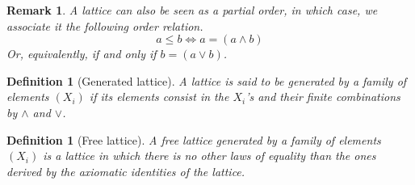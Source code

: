 \documentclass[a4paper, 11pt]{article}
\newtheorem{definition}[theorem]{Definition}
\newtheorem*{remark}{Remark}
\begin{document}
    \begin{remark}
    A lattice can also be seen as a partial order, in which case, we associate it the following order
    relation.
    \[
	a\leq b\Leftrightarrow a=(a\wedge b)
    \]
    Or, equivalently, if and only if $b=(a\vee b)$.	
    \end{remark}
    \begin{definition}[Generated lattice]
	    A lattice is said to be generated by a family of elements $(X_i)$ if its elements consist in
	    the $X_i$'s and their finite combinations by $\wedge$ and $\vee$.
    \end{definition}
    \begin{definition}[Free lattice]
	    A free lattice generated by a family of elements $(X_i)$ is a lattice in which there is no
	    other laws of equality than the ones derived by the axiomatic identities of the lattice.
    \end{definition}
\end{document}
